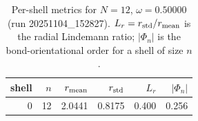 \begin{table}[t]
\centering
\small
\setlength{\tabcolsep}{4pt}
\renewcommand{\arraystretch}{1.15}
\begin{tabular}{r r r r r r}
\toprule
shell & $n$ & $r_{\rm mean}$ & $r_{\rm std}$ & $L_r$ & $|\Phi_n|$ \\
\midrule
0 & 12 & 2.0441 & 0.8175 & 0.400 & 0.256 \\
\bottomrule
\end{tabular}
\caption{Per-shell metrics for $N=12$, $\omega=0.50000$ (run 20251104_152827). $L_r=r_{\rm std}/r_{\rm mean}$ is the radial Lindemann ratio; $|\Phi_n|$ is the bond-orientational order for a shell of size $n$.}
\end{table}